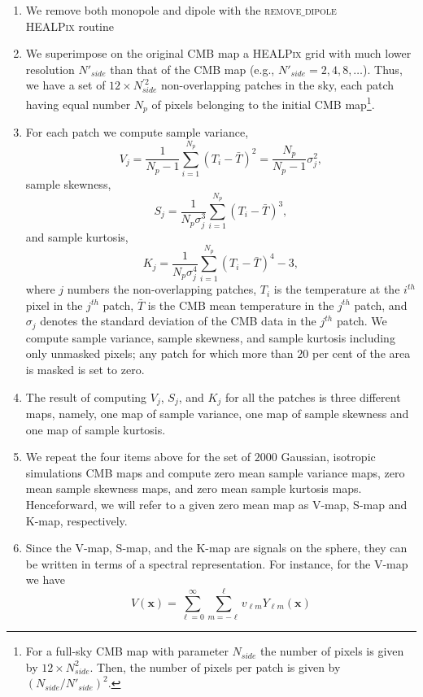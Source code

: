 \begin{enumerate}
\item We remove both monopole and dipole with the \textsc{remove$\_$dipole} \\ \textsc{HEALPix} routine 
\item We superimpose on the original CMB map a \textsc{HEALPix} grid with much lower resolution $N'_{side}$ than that of the CMB map (e.g., $N'_{side} = 2,4,8,\dots$). Thus, we have a set of $12 \times N^{'2}_{side}$ non-overlapping patches in the sky, each patch having equal number $N_p$ of pixels belonging to the initial CMB map\footnote{For a full-sky CMB map with parameter $N_{side}$ the number of pixels is given by $12 \times N^2_{side}$. Then, the number of pixels per patch is given by $\left(N_{side}/N'_{side}\right)^2$.}. %
\item For each patch we compute sample variance,
\begin{equation}
\label{eq:1}
V_j = \frac{1}{N_p -1} \sum_{i=1}^{N_p} (T_i - \bar{T})^2 = \frac{N_p}{N_p -1} \sigma_j^2 ,
\end{equation}
sample skewness,
\begin{equation}
\label{eq:2}
S_j = \frac{1}{N_p \sigma_j^3} \sum_{i=1}^{N_p} (T_i - \bar{T})^3 ,
\end{equation}
and sample kurtosis,
\begin{equation}
\label{eq:3}
K_j = \frac{1}{N_p \sigma_j^4} \sum_{i=1}^{N_p} (T_i - \bar{T})^4 - 3 ,
\end{equation}
where $j$ numbers the non-overlapping patches, $T_i$ is the temperature at the $i^{th}$ pixel in the $j^{th}$ patch, $\bar{T}$ is the CMB mean temperature in the $j^{th}$ patch, and $\sigma_j$ denotes the standard deviation of the CMB data in the $j^{th}$ patch. We compute sample variance, sample skewness, and sample kurtosis including only unmasked pixels; any patch for which more than $20$ per cent of the area is masked is set to zero.
\item The result of computing $V_j$, $S_j$, and $K_j$ for all the patches is three different maps, namely, one map of sample variance, one map of sample skewness and one map of sample kurtosis. 
\item We repeat the four items above for the set of $2000$ Gaussian, isotropic simulations CMB maps and compute zero mean sample variance maps, zero mean sample skewness maps, and zero mean sample kurtosis maps. Henceforward, we will refer to a given zero mean map as V-map, S-map and K-map, respectively.
\item Since the V-map, S-map, and the K-map are signals on the sphere, they can be written in terms of a spectral representation. For instance, for the V-map we have 
\begin{equation}
\label{eq:4}
V(\mathbf{x}) = \sum^{\infty}_{\ell=0} \sum^{\ell}_{m=-\ell} v_{\ell m} Y_{\ell m} (\mathbf{x})
\end{equation}


\end{enumerate}
